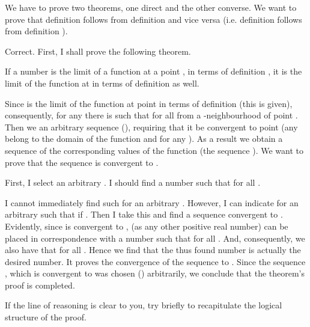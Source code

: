 \begin{s}
We have to prove two theorems, one direct and the other converse. We want to prove that definition  follows from definition  and vice versa (i.e. definition  follows from definition ).
\end{s}


\begin{p}
Correct. First, I shall prove the following theorem.
\begin{thm}
If a number  is the limit of a function  at a point , in terms of definition , it is the limit of the function  at  in terms of definition  as well.
\end{thm}

Since  is the limit of the function  at point  in terms of definition  (this is given), consequently, for any  there is  such that  for all  from a \hlm{$\delta$}-neighbourhood of point . Then we  an arbitrary sequence (), requiring that it be convergent to point  (any  belong to the domain of the function and  for any ). As a result we obtain a sequence of the corresponding values of the function (the sequence \hlm{$[f (x_{n} ) ]$}). We want	to prove that the sequence \hlm{$[f (x_{n})]$} is convergent to .

First, I select an arbitrary . I should find a number  such that  for all .

I cannot immediately find such  for an arbitrary \hlm{$\varepsilon$}. However, I can indicate for an arbitrary \hlm{$\varepsilon$} such \hlm{$\delta$} that  if . Then I take this \hlm{$\delta$} and find a sequence  convergent to . Evidently, since  is convergent to , \hlm{$\delta$} (as any other positive real number) can be placed in correspondence with a number  such that  for all . And, consequently, we also have that  for all . Hence we find that the thus found number  is actually the desired number. It proves	the	convergence of the sequence \hlm{$[f (x_{n})]$} to . Since the sequence ,	which is convergent to  was chosen () arbitrarily, we conclude that the theorem's proof is completed.

If the line of reasoning is clear to you, try briefly to recapitulate the logical structure of the proof.
\end{p}

